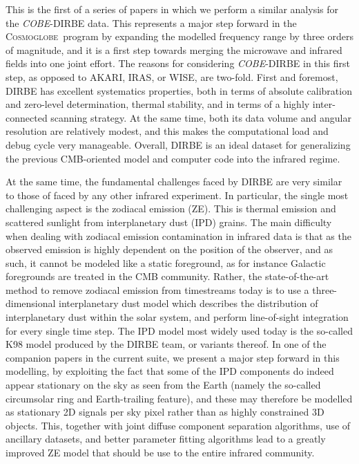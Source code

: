 \documentclass{aa}
\def\Cosmoglobe{\textsc{Cosmoglobe}}
\def\COBE{\textit{COBE}}
\begin{document}
This is the first of a series of papers in which we perform a similar analysis for the \COBE-DIRBE data. This represents a major step forward in the \Cosmoglobe\ program by expanding the modelled frequency range by three orders of magnitude, and it is a first step towards merging the microwave and infrared fields into one joint effort. The reasons for considering \COBE-DIRBE in this first step, as opposed to AKARI, IRAS, or WISE, are two-fold. First and foremost, DIRBE has excellent systematics properties, both in terms of absolute calibration and zero-level determination, thermal stability, and in terms of a highly inter-connected scanning strategy. At the same time, both its data volume and angular resolution are relatively modest, and this makes the computational load and debug cycle very manageable. Overall, DIRBE is an ideal dataset for generalizing the previous CMB-oriented model and computer code into the infrared regime.

At the same time, the fundamental challenges faced by DIRBE are very similar to those of faced by any other infrared experiment. In particular, the single most challenging aspect is the zodiacal emission (ZE). This is thermal emission and scattered sunlight from interplanetary dust (IPD) grains. The main difficulty when dealing with zodiacal emission contamination in infrared data is that as the observed emission is highly dependent on the position of the observer, and as such, it cannot be modeled like a static foreground, as for instance Galactic foregrounds are treated in the CMB community. Rather, the state-of-the-art method to remove zodiacal emission from timestreams today is to use a three-dimensional interplanetary dust model which describes the distribution of interplanetary dust within the solar system, and perform line-of-sight integration for every single time step. The IPD model most widely used today is the so-called K98 model \citep{kelsall1998} produced by the DIRBE team, or variants thereof. In one of the companion papers in the current suite, we present a major step forward in this modelling, by exploiting the fact that some of the IPD components do indeed appear stationary on the sky as seen from the Earth (namely the so-called circumsolar ring and Earth-trailing feature), and these may therefore be modelled as stationary 2D signals per sky pixel rather than as highly constrained 3D objects. This, together with joint diffuse component separation algorithms, use of ancillary datasets, and better parameter fitting algorithms lead to a greatly improved ZE model that should be use to the entire infrared community.
\end{document}
